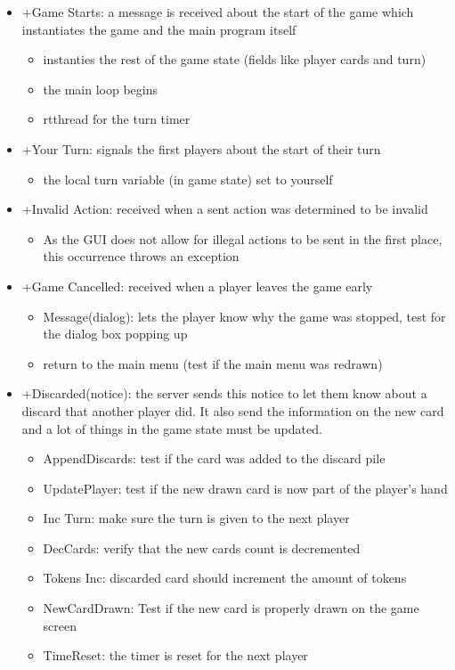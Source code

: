 \documentclass[12pt]{article}
\begin{document}
\begin{description}
\begin{itemize}
		\item +Game Starts: a message is received about the start of the game which instantiates the game and the main program itself
		\begin{itemize}
		    \item instanties the rest of the game state (fields like player cards and turn)
		    \item the main loop begins 
		    \item rtthread for the turn timer
		\end{itemize}
		\item +Your Turn: signals the first players about the start of their turn
		\begin{itemize}
		    \item the local turn variable (in game state) set to yourself
		\end{itemize}
		\item +Invalid Action: received when a sent action was determined to be invalid
		\begin{itemize}
		    \item As the GUI does not allow for illegal actions to be sent in the first place, this occurrence throws an exception
		\end{itemize}
		\item +Game Cancelled: received when a player leaves the game early
		\begin{itemize}
		    \item Message(dialog): lets the player know why the game was stopped, test for the dialog box popping up
		    \item return to the main menu (test if the main menu was redrawn)
		\end{itemize}
		\item +Discarded(notice): the server sends this notice to let them know about a discard that another player did. It also send the information on the new card and a lot of things in the game state must be updated.
		\begin{itemize}
		    \item AppendDiscards: test if the card was added to the discard pile
		    \item UpdatePlayer: test if the new drawn card is now part of the player's hand
		    \item Inc Turn: make sure the turn is given to the next player
		    \item DecCards: verify that the new cards count is decremented
		    \item Tokens Inc: discarded card should increment the amount of tokens
		    \item NewCardDrawn: Test if the new card is properly drawn on the game screen
		    \item TimeReset: the timer is reset for the next player
		    

\end{itemize}
\end{itemize}
\end{description}
\end{document}
